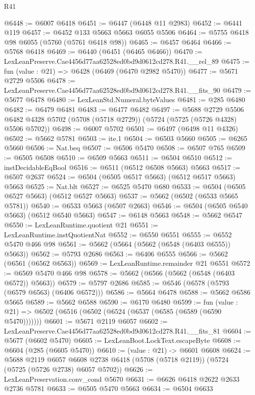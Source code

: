 \begin{lexlean}{R41}
\begin{coremodule}
@6448 := @6007 @6418
@6451 := @6447 (@6448 @11 @2983)
@6452 := @6441 @119
@6457 := @6452 @133 @5663 @5663 @6055 @5506
@6464 := @5755 @6418 @98 @6055 (@5760 (@5761 @6418 @98))
@6465 := @6457 @6464
@6466 := @5768 @6418
@6469 := @6440 (@6451 (@6465 @6466))
@6470 := LexLeanPreserve.Cae4456d77aa62528ed0bd9d0612cd278.R41.__rel_89
@6475 := fun (value : @21) => @6428 (@6469 (@6470 @2982 @5470))
@6477 := @5671 @2729 @5506
@6478 := LexLeanPreserve.Cae4456d77aa62528ed0bd9d0612cd278.R41.__fits_90
@6479 := @5677 @6478
@6480 := LexLeanStd.Numeral.byteValues
@6481 := @285 @6480
@6482 := @6479 @6481
@6483 := @6477 @6482
@6497 := @5688
    @2729
    @5506
    @6482
    @4328
    @5702
    (@5708 (@5718 @2729))
    (@5724 (@5725 (@5726 @4328) @5506 @5702))
@6498 := @6007 @5702
@6501 := @6497 (@6498 @11 @4326)
@6502 := @5662 @5781
@6503 := ite.{1}
@6504 := @6503 @5660
@6505 := @6265 @5660
@6506 := Nat.beq
@6507 := @6506 @5470
@6508 := @6507 @765
@6509 := @6505 @6508
@6510 := @6509 @5663
@6511 := @6504 @6510
@6512 := instDecidableEqBool
@6516 := @6511 (@6512 @6508 @5663) @5663
@6517 := @6507 @2637
@6524 := @6504 (@6505 @6517 @5663) (@6512 @6517 @5663) @5663
@6525 := Nat.blt
@6527 := @6525 @5470 @680
@6533 := @6504 (@6505 @6527 @5663) (@6512 @6527 @5663)
@6537 := @5662 (@6502 (@6533 @5665 @5781))
@6540 := @6533 @5663 (@6507 @2663)
@6546 := @6504 (@6505 @6540 @5663) (@6512 @6540 @5663)
@6547 := @6148 @5663
@6548 := @5662 @6547
@6550 := LexLeanRuntime.quotient @21
@6551 := LexLeanRuntime.instQuotientNat
@6552 := @6550 @6551
@6555 := @6552 @5470 @466 @98
@6561 := @5662 (@5664 (@5662 (@6548 (@6403 @6555)) @5663))
@6562 := @5793 @2686
@6563 := @6406 @6555
@6566 := @5662 (@6561 (@6562 @6563))
@6569 := LexLeanRuntime.remainder @21 @6551
@6572 := @6569 @5470 @466 @98
@6578 := @5662 (@6566 (@5662 (@6548 (@6403 @6572)) @5663))
@6579 := @5797 @2686
@6585 := @6546 (@6578 (@5793 (@6579 @6563) (@6406 @6572)))
@6586 := @5664 @6478
@6588 := @5662 @6586 @5665
@6589 := @5662 @6588
@6590 := @6170 @6480
@6599 := fun (value : @21) => @6502 (@6516 (@6502 (@6524 (@6537 (@6585 (@6589 (@6590 @5470)))))))
@6601 := @5671 @2119 @6057
@6602 := LexLeanPreserve.Cae4456d77aa62528ed0bd9d0612cd278.R41.__fits_81
@6604 := @5677 (@6602 @5470)
@6605 := LexLeanBoot.LockText.escapeByte
@6608 := @6604 (@285 (@6605 @5470))
@6610 := (value : @21) -> @6601 @6608
@6624 := @5688
    @2119
    @6057
    @6608
    @2738
    @6418
    (@5708 (@5718 @2119))
    (@5724 (@5725 (@5726 @2738) @6057 @5702))
@6626 := LexLeanPreservation.conv_cond @5670
@6631 := @6626 @6418 @2622 @2633 @2736 @5781
@6633 := @6505 @5470 @5663
@6634 := @6504 @6633

\end{coremodule}
\end{lexlean}
